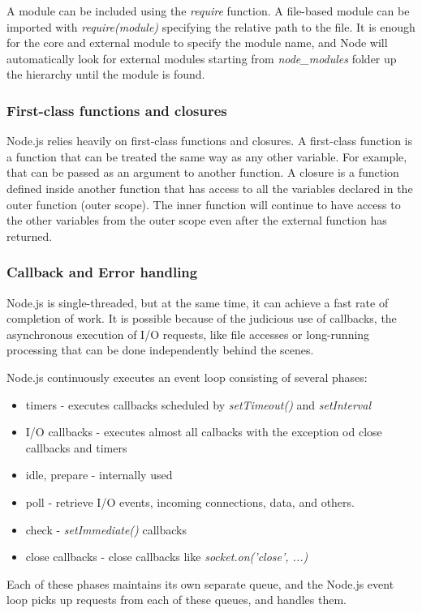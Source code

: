 A module can be included using the \textit{require} function. A file-based module can be imported with \textit{require(module)} specifying the relative path to the file. It is enough for the core and external module to specify the module name, and Node will automatically look for external modules starting from \textit{node\_modules} folder up the hierarchy until the module is found.

\pagebreak

\subsubsection*{First-class functions and closures}
Node.js relies heavily on first-class functions and closures. A first-class function is a function that can be treated the same way as any other variable. For example, that can be passed as an argument to another function.
A closure is a function defined inside another function that has access to all the variables declared in the outer function (outer scope).
The inner function will continue to have access to the other variables from the outer scope even after the external function has returned.

\subsubsection*{Callback and Error handling}
Node.js is single-threaded, but at the same time, it can achieve a fast rate of completion of work. It is possible because of the judicious use of callbacks, the asynchronous execution of I/O requests, like file accesses or long-running processing that can be done independently behind the scenes.

Node.js continuously executes an event loop consisting of several phases:
\begin{itemize}
    \item timers - executes callbacks scheduled by \textit{setTimeout()} and \textit{setInterval}
    \item I/O callbacks - executes almost all calbacks with the exception od close callbacks and timers
    \item idle, prepare - internally used
    \item poll - retrieve I/O events, incoming connections, data, and others.
    \item check - \textit{setImmediate()} callbacks
    \item close callbacks - close callbacks like \textit{socket.on('close', ...)}
\end{itemize}
Each of these phases maintains its own separate queue, and the Node.js event loop picks up requests from each of these queues, and handles them. 

